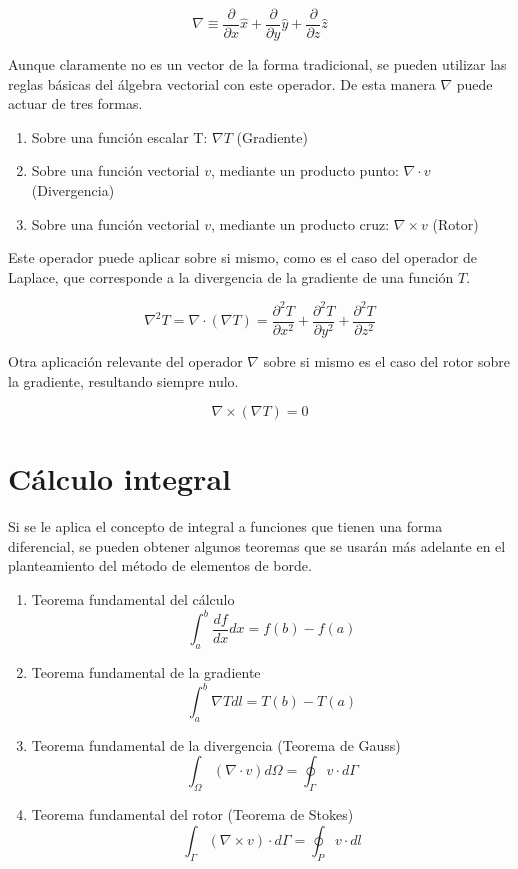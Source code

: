\documentclass[12pt,letterpaper]{article}
\numberwithin{equation}{section}
\begin{document}
$$\nabla\equiv\frac{\partial}{\partial x}\hat{x}+\frac{\partial}{\partial y}\hat{y}+\frac{\partial}{\partial z}\hat{z}$$ 

\noindent Aunque claramente no es un vector de la forma tradicional, se pueden utilizar las reglas básicas del álgebra vectorial con este operador. De esta manera $\nabla$ puede actuar de tres formas.

\begin{enumerate}
	\item Sobre una función escalar T: $\nabla T$ (Gradiente)
	\item Sobre una función vectorial $v$, mediante un producto punto: $\nabla\cdot v$ (Divergencia)
	\item Sobre una función vectorial $v$, mediante un producto cruz: $\nabla\times v$ (Rotor)
\end{enumerate}

\noindent Este operador puede aplicar sobre si mismo, como es el caso del operador de Laplace, que corresponde a la divergencia de la gradiente de una función $T$.

$$\nabla^2 T=\nabla\cdot (\nabla T)=\frac{\partial^2 T}{\partial x^2}+\frac{\partial^2 T}{\partial y^2}+\frac{\partial^2 T}{\partial z^2}$$

\noindent Otra aplicación relevante del operador $\nabla$ sobre si mismo es el caso del rotor sobre la gradiente, resultando siempre nulo.

$$\nabla\times(\nabla T)=0$$

\pagebreak
\section*{Cálculo integral}
Si se le aplica el concepto de integral a funciones que tienen una forma diferencial, se pueden obtener algunos teoremas que se usarán más adelante en el planteamiento del método de elementos de borde.

\begin{enumerate}
	\item Teorema fundamental del cálculo
	$$\int_{a}^{b}\frac{df}{dx}dx=f(b)-f(a)$$
	\item Teorema fundamental de la gradiente
	$$\int_{a}^{b}\nabla Tdl=T(b)-T(a)$$
	\item Teorema fundamental de la divergencia (Teorema de Gauss)
	$$\int_{\Omega}(\nabla\cdot v)d\varOmega=\oint_{\Gamma}v\cdot d\varGamma$$
	\item Teorema fundamental del rotor (Teorema de Stokes)
	$$\int_{\Gamma}(\nabla\times v)\cdot d\varGamma=\oint_{P}v\cdot dl$$ 
\end{enumerate}
\end{document}

